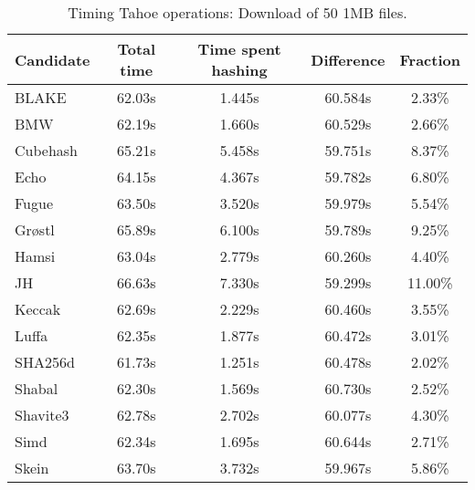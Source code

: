 \begin{table}[h]
  \centering
  \begin{tabular}{ | l | c | c | c | c | }
    \hline
    Candidate & Total time & Time spent hashing & Difference & Fraction \\ \hline
    BLAKE     &  62.03s  &  1.445s  &  60.584s  &  2.33\%   \\  \hline
    BMW       &  62.19s  &  1.660s  &  60.529s  &  2.66\%   \\  \hline
    Cubehash  &  65.21s  &  5.458s  &  59.751s  &  8.37\%   \\  \hline
    Echo      &  64.15s  &  4.367s  &  59.782s  &  6.80\%   \\  \hline
    Fugue     &  63.50s  &  3.520s  &  59.979s  &  5.54\%   \\  \hline
    Grøstl    &  65.89s  &  6.100s  &  59.789s  &  9.25\%   \\  \hline
    Hamsi     &  63.04s  &  2.779s  &  60.260s  &  4.40\%   \\  \hline
    JH        &  66.63s  &  7.330s  &  59.299s  &  11.00\%  \\  \hline
    Keccak    &  62.69s  &  2.229s  &  60.460s  &  3.55\%   \\  \hline
    Luffa     &  62.35s  &  1.877s  &  60.472s  &  3.01\%   \\  \hline
    SHA256d   &  61.73s  &  1.251s  &  60.478s  &  2.02\%   \\  \hline
    Shabal    &  62.30s  &  1.569s  &  60.730s  &  2.52\%   \\  \hline
    Shavite3  &  62.78s  &  2.702s  &  60.077s  &  4.30\%   \\  \hline
    Simd      &  62.34s  &  1.695s  &  60.644s  &  2.71\%   \\  \hline
    Skein     &  63.70s  &  3.732s  &  59.967s  &  5.86\%   \\  \hline
  \end{tabular}
  \caption{Timing Tahoe operations: Download of 50 1MB files.}
  \label{tbl:hashingtimes:get1mb}
\end{table}
